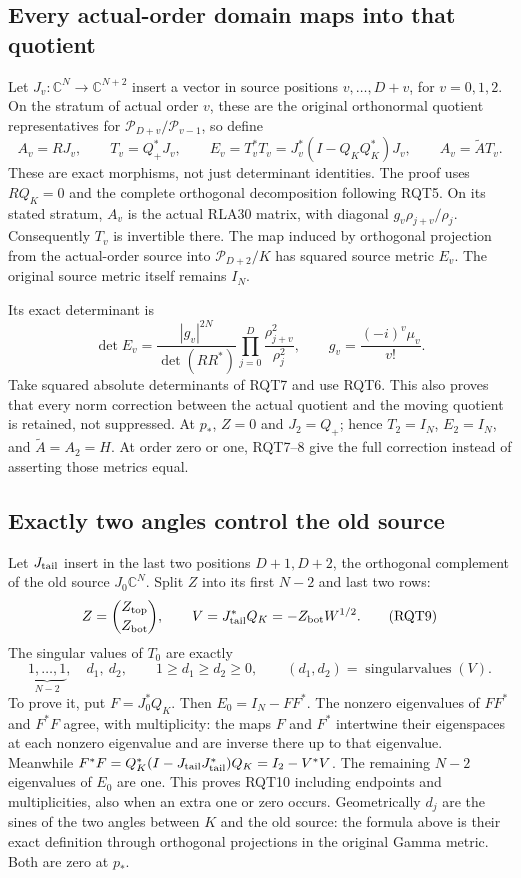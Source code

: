 \subsection{Every actual-order domain maps into that quotient}
Let $J_v:\mathbb C^N\to\mathbb C^{N+2}$ insert a vector in
source positions $v,\ldots,D+v$, for $v=0,1,2$.
On the stratum of actual order $v$, these are the original
orthonormal quotient representatives for
$\mathcal P_{D+v}/\mathcal P_{v-1}$, so define
\[
 A_v=RJ_v,\qquad T_v=Q_+^*J_v,\qquad E_v=T_v^*T_v
 =J_v^*(I-Q_KQ_K^*)J_v,\qquad A_v=\widetilde A T_v.
 \tag{RQT7}
\]
These are exact morphisms, not just determinant identities.
The proof uses $RQ_K=0$ and the complete orthogonal decomposition
following RQT5.  On its stated stratum, $A_v$ is the actual
RLA30 matrix, with diagonal $g_v\rho_{j+v}/\rho_j$.
Consequently $T_v$ is invertible there.  The map induced by
orthogonal projection from the actual-order source into
$\mathcal P_{D+2}/K$ has squared source metric $E_v$.
The original source metric itself remains $I_N$.

Its exact determinant is
\[
 \det E_v=\frac{|g_v|^{2N}}{\det(RR^*)}
       \prod_{j=0}^D\frac{\rho_{j+v}^2}{\rho_j^2},\qquad
 g_v=\frac{(-i)^v\mu_v}{v!}.
 \tag{RQT8}
\]
Take squared absolute determinants of RQT7 and use RQT6.
This also proves that every norm correction between the actual
quotient and the moving quotient is retained, not suppressed.
At $p_*$, $Z=0$ and $J_2=Q_+$; hence $T_2=I_N$, $E_2=I_N$,
and $\widetilde A=A_2=H$.  At order zero or one, RQT7--8
give the full correction instead of asserting those metrics equal.

\subsection{Exactly two angles control the old source}
Let $J_{\rm tail}$ insert in the last two positions $D+1,D+2$,
the orthogonal complement of the old source $J_0\mathbb C^N$.
Split $Z$ into its first $N-2$ and last two rows:
\[
 Z=\binom{Z_{\rm top}}{Z_{\rm bot}},\qquad
 V=J_{\rm tail}^*Q_K=-Z_{\rm bot}W^{1/2}.
 \tag{RQT9}
\]
The singular values of $T_0$ are exactly
\[
 \underbrace{1,\ldots,1}_{N-2},\quad d_1,\ d_2,
 \qquad 1\ge d_1\ge d_2\ge0,
 \qquad (d_1,d_2)=\operatorname{singularvalues}(V).
 \tag{RQT10}
\]
To prove it, put $F=J_0^*Q_K$.  Then $E_0=I_N-FF^*$.
The nonzero eigenvalues of $FF^*$ and $F^*F$ agree, with
multiplicity: the maps $F$ and $F^*$ intertwine their eigenspaces
at each nonzero eigenvalue and are inverse there up to that
eigenvalue.  Meanwhile
$F^*F=Q_K^*(I-J_{\rm tail}J_{\rm tail}^*)Q_K=I_2-V^*V$.
The remaining $N-2$ eigenvalues of $E_0$ are one.  This proves
RQT10 including endpoints and multiplicities, also when an extra
one or zero occurs.  Geometrically $d_j$ are the sines of the
two angles between $K$ and the old source: the formula above is
their exact definition through orthogonal projections in the
original Gamma metric.  Both are zero at $p_*$.

